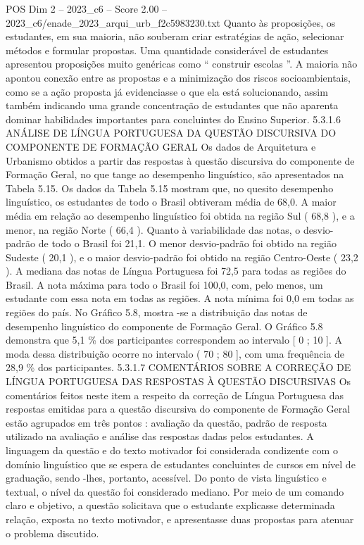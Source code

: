 \begin{textsample}{POS Dim 2 – 2023\_c6 – Score 2.00 – 2023\_c6/enade\_2023\_arqui\_urb\_f2c5983230.txt}
Quanto às proposições, os estudantes, em sua maioria, não souberam criar estratégias de ação, selecionar métodos e formular propostas.
Uma quantidade considerável de estudantes apresentou proposições muito genéricas como “ construir escolas ”.
A maioria não apontou conexão entre as propostas e a minimização dos riscos socioambientais, como se a ação proposta já evidenciasse o que ela está solucionando, assim também indicando uma grande concentração de estudantes que não aparenta dominar habilidades importantes para concluintes do Ensino Superior. 5.3.1.6 ANÁLISE DE LÍNGUA PORTUGUESA DA QUESTÃO DISCURSIVA DO COMPONENTE DE FORMAÇÃO GERAL Os dados de Arquitetura e Urbanismo obtidos a partir das respostas à questão discursiva do componente de Formação Geral, no que tange ao desempenho linguístico, são apresentados na Tabela 5.15.
Os dados da Tabela 5.15 mostram que, no quesito desempenho linguístico, os estudantes de todo o Brasil obtiveram média de 68,0.
A maior média em relação ao desempenho linguístico foi obtida na região Sul ( 68,8 ), e a menor, na região Norte ( 66,4 ).
Quanto à variabilidade das notas, o desvio-padrão de todo o Brasil foi 21,1.
O menor desvio-padrão foi obtido na região Sudeste ( 20,1 ), e o maior desvio-padrão foi obtido na região Centro-Oeste ( 23,2 ).
A mediana das notas de Língua Portuguesa foi 72,5 para todas as regiões do Brasil.
A nota máxima para todo o Brasil foi 100,0, com, pelo menos, um estudante com essa nota em todas as regiões.
A nota mínima foi 0,0 em todas as regiões do país.
No Gráfico 5.8, mostra -se a distribuição das notas de desempenho linguístico do componente de Formação Geral.
O Gráfico 5.8 demonstra que 5,1 \% dos participantes correspondem ao intervalo [ 0 ; 10 ].
A moda dessa distribuição ocorre no intervalo ( 70 ; 80 ], com uma frequência de 28,9 \% dos participantes. 5.3.1.7 COMENTÁRIOS SOBRE A CORREÇÃO DE LÍNGUA PORTUGUESA DAS RESPOSTAS À QUESTÃO DISCURSIVAS Os comentários feitos neste item a respeito da correção de Língua Portuguesa das respostas emitidas para a questão discursiva do componente de Formação Geral estão agrupados em três pontos : avaliação da questão, padrão de resposta utilizado na avaliação e análise das respostas dadas pelos estudantes.
A linguagem da questão e do texto motivador foi considerada condizente com o domínio linguístico que se espera de estudantes concluintes de cursos em nível de graduação, sendo -lhes, portanto, acessível.
Do ponto de vista linguístico e textual, o nível da questão foi considerado mediano.
Por meio de um comando claro e objetivo, a questão solicitava que o estudante explicasse determinada relação, exposta no texto motivador, e apresentasse duas propostas para atenuar o problema discutido.

\end{textsample}
